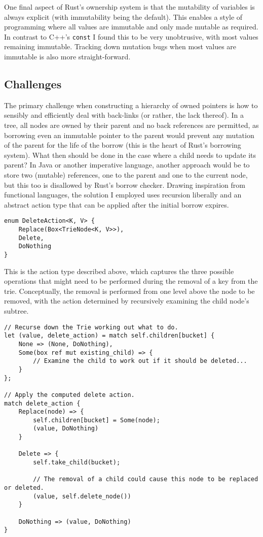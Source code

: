 \documentclass[a4paper,12pt]{article}
\newcommand{\code}{\texttt}
\begin{document}
One final aspect of Rust's ownership system is that the mutability of variables is always explicit (with immutability being the default). This enables a style of programming where all values are immutable and only made mutable as required. In contrast to C++'s \code{const} I found this to be very unobtrusive, with most values remaining immutable. Tracking down mutation bugs when most values are immutable is also more straight-forward.

\subsection{Challenges}

The primary challenge when constructing a hierarchy of owned pointers is how to sensibly and efficiently deal with back-links (or rather, the lack thereof). In a tree, all nodes are owned by their parent and no back references are permitted, as borrowing even an immutable pointer to the parent would prevent any mutation of the parent for the life of the borrow (this is the heart of Rust's borrowing system). What then should be done in the case where a child needs to update its parent? In Java or another imperative language, another approach would be to store two (mutable) references, one to the parent and one to the current node, but this too is disallowed by Rust's borrow checker. Drawing inspiration from functional languages, the solution I employed uses recursion liberally and an abstract action type that can be applied after the initial borrow expires.

\begin{verbatim}
enum DeleteAction<K, V> {
    Replace(Box<TrieNode<K, V>>),
    Delete,
    DoNothing
}
\end{verbatim}

This is the action type described above, which captures the three possible operations that might need to be performed during the removal of a key from the trie. Conceptually, the removal is performed from one level above the node to be removed, with the action determined by recursively examining the child node's subtree.

\begin{verbatim}
// Recurse down the Trie working out what to do.
let (value, delete_action) = match self.children[bucket] {
    None => (None, DoNothing),
    Some(box ref mut existing_child) => {
        // Examine the child to work out if it should be deleted...
    }
};

// Apply the computed delete action.
match delete_action {
    Replace(node) => {
        self.children[bucket] = Some(node);
        (value, DoNothing)
    }

    Delete => {
        self.take_child(bucket);

        // The removal of a child could cause this node to be replaced or deleted.
        (value, self.delete_node())
    }

    DoNothing => (value, DoNothing)
}
\end{verbatim}
\end{document}

